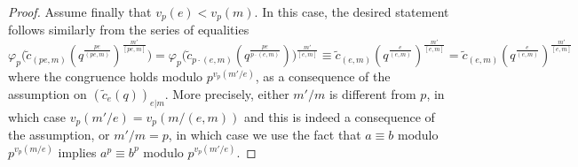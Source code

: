 \documentclass[10pt,a4paper]{amsart}
\begin{document}
\begin{proof}
    Assume finally that $v_p(e)<v_p(m)$. In this case, the desired statement follows similarly from the series of equalities
    $$\varphi_p\big(\tilde{c}_{(pe,m)}(q^{\frac{pe}{(pe,m)}})^{\frac{m'}{[pe,m]}}\big) = \varphi_p\big(\tilde{c}_{p\cdot(e,m)}(q^{\frac{pe}{p\cdot(e,m)}})\big)^{\frac{m'}{[e,m]}} \equiv \tilde{c}_{(e,m)}(q^{\frac{e}{(e,m)}})^{\frac{m'}{[e,m]}} = \tilde{c}_{(e,m)}(q^{\frac{e}{(e,m)}})^{\frac{m'}{[e,m]}}$$
    where the congruence holds modulo $p^{v_p(m'/e)}$, as a consequence of the assumption on $(\tilde{c}_e(q))_{e|m}$.  
    More precisely, either $m'/m$ is different from $p$, in which case $v_p(m'/e)=v_p(m/(e,m))$ and this is indeed a consequence of the assumption, or $m'/m=p$, in which case we use the fact that $a \equiv b$ modulo $p^{v_p(m/e)}$ implies $a^p \equiv b^p$ modulo $p^{v_p(m'/e)}$. 
\end{proof}
\end{document}
